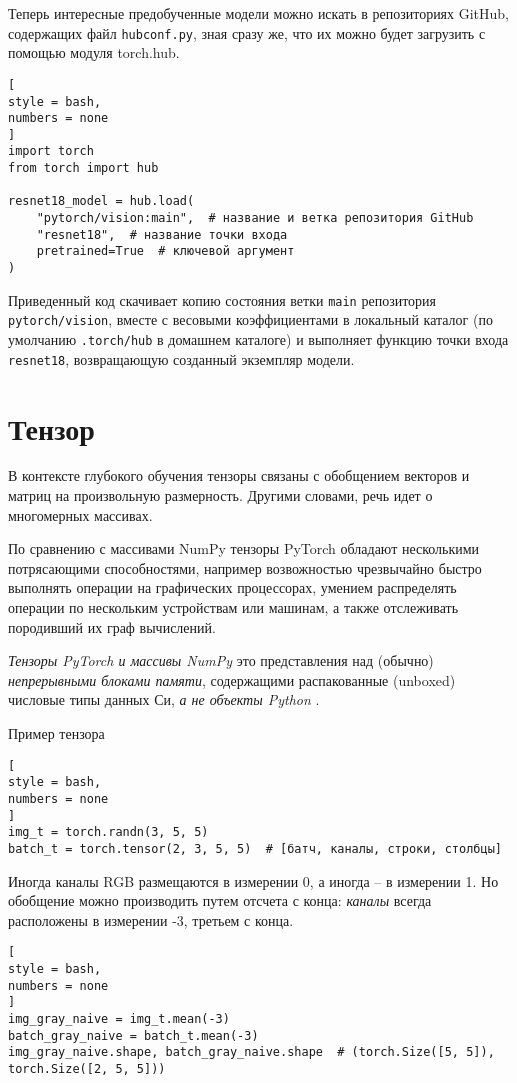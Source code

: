\documentclass[%
	11pt,
	a4paper,
	utf8,
		]{article}
\begin{document}
Теперь интересные предобученные модели можно искать в репозиториях GitHub, содержащих файл \verb|hubconf.py|, зная сразу же, что их можно будет загрузить с помощью модуля torch.hub.
\begin{lstlisting}[
style = bash,
numbers = none	
]
import torch
from torch import hub

resnet18_model = hub.load(
    "pytorch/vision:main",  # название и ветка репозитория GitHub
    "resnet18",  # название точки входа
    pretrained=True  # ключевой аргумент
)
\end{lstlisting}

Приведенный код скачивает копию состояния ветки \verb|main| репозитория \verb|pytorch/vision|, вместе с весовыми коэффициентами в локальный каталог (по умолчанию \verb|.torch/hub| в домашнем каталоге) и выполняет функцию точки входа \verb|resnet18|, возвращающую созданный экземпляр модели.

\section{Тензор}

В контексте глубокого обучения тензоры связаны с обобщением векторов и матриц на произвольную размерность. Другими словами, речь идет о многомерных массивах.

По сравнению с массивами NumPy тензоры PyTorch обладают несколькими потрясающими способностями, например возвожностью чрезвычайно быстро выполнять операции на графических процессорах, умением распределять операции по нескольким устройствам или машинам, а также отслеживать породивший их граф вычислений. 

\emph{\color{blue}Тензоры PyTorch и массивы NumPy} это представления над (обычно) \emph{\color{blue}непрерывными блоками памяти}, содержащими распакованные (unboxed) числовые типы данных Си, \emph{а не объекты Python} \cite[]{pytorch-2022}.

Пример тензора
\begin{lstlisting}[
style = bash,
numbers = none
]
img_t = torch.randn(3, 5, 5)
batch_t = torch.tensor(2, 3, 5, 5)  # [батч, каналы, строки, столбцы]
\end{lstlisting}

Иногда каналы RGB размещаются в измерении 0, а иногда -- в измерении 1. Но обобщение можно производить путем отсчета с конца: \emph{каналы} всегда расположены в измерении -3, третьем с конца. 
\begin{lstlisting}[
style = bash,
numbers = none
]
img_gray_naive = img_t.mean(-3)
batch_gray_naive = batch_t.mean(-3)
img_gray_naive.shape, batch_gray_naive.shape  # (torch.Size([5, 5]), torch.Size([2, 5, 5]))
\end{lstlisting}
\end{document}
